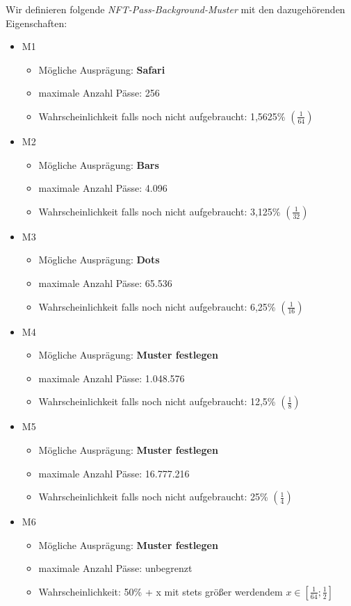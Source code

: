 \begin{NFT-Prop}

Wir definieren folgende \textit{NFT-Pass-Background-Muster} mit den dazugehörenden Eigenschaften:

\begin{itemize}
    \item M1
    \begin{itemize}
    	\item Mögliche Ausprägung: \textbf{Safari} 
    	\item maximale Anzahl Pässe: 256
    	\item Wahrscheinlichkeit falls noch nicht aufgebraucht: 1,5625\% $\left( \frac{1}{64} \right)$
    \end{itemize}
    \item M2
    \begin{itemize}
    	\item Mögliche Ausprägung: \textbf{Bars} 
    	\item maximale Anzahl Pässe: 4.096
    	\item Wahrscheinlichkeit falls noch nicht aufgebraucht: 3,125\% $\left( \frac{1}{32} \right)$
    \end{itemize}
    \item M3
    \begin{itemize}
    	\item Mögliche Ausprägung: \textbf{Dots} 
    	\item maximale Anzahl Pässe: 65.536
    	\item Wahrscheinlichkeit falls noch nicht aufgebraucht: 6,25\% $\left( \frac{1}{16} \right)$
    \end{itemize}
    \item M4
    \begin{itemize}
    	\item Mögliche Ausprägung: \textbf{Muster festlegen} 
    	\item maximale Anzahl Pässe: 1.048.576
    	\item Wahrscheinlichkeit falls noch nicht aufgebraucht: 12,5\% $\left( \frac{1}{8} \right)$
    \end{itemize}
    \item M5
    \begin{itemize}
    	\item Mögliche Ausprägung: \textbf{Muster festlegen}  
    	\item maximale Anzahl Pässe: 16.777.216
    	\item Wahrscheinlichkeit falls noch nicht aufgebraucht: 25\% $\left( \frac{1}{4} \right)$
    \end{itemize}
    \item M6
    \begin{itemize}
    	\item Mögliche Ausprägung: \textbf{Muster festlegen}
    	\item maximale Anzahl Pässe: unbegrenzt  
    	\item Wahrscheinlichkeit: 50\% + x mit stets größer werdendem $x \in \left[ \frac{1}{64}; \frac{1}{2} \right]$
    \end{itemize}
\end{itemize}


\end{NFT-Prop}
